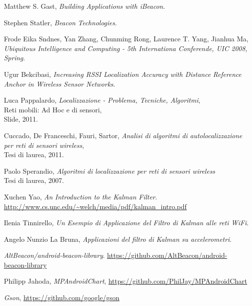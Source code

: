 \begin{thebibliography}{9}
	\bibitem{}
	Matthew S. Gast,
	\textit{Building Applications with iBeacon}.
	
	\bibitem{}
	Stephen Statler,
	\textit{Beacon Technologies}.
	
	\bibitem{}
	Frode Eika Sndnes, Yan Zhang, Chunming Rong, Laurence T. Yang, Jianhua Ma,
	\textit{Ubiquitous Intelligence and Computing - 5th Internationa Conferende, UIC 2008, Spring}.
	
	\bibitem{}
	Ugur Bekcibasi,
	\textit{Increasing RSSI Localization Accuracy with Distance Reference Anchor in Wireless Sensor Networks}.

	
	\bibitem{}
	Luca Pappalardo, 
	\textit{Localizzazione - Problema, Tecniche, Algoritmi},
	\\Reti mobili: Ad Hoc e di sensori, 
	\\Slide, 2011.
	
	\bibitem{}
	Cuccado, De Franceschi, Fauri, Sartor,
	\textit{Analisi di algoritmi di autolocalizzazione per reti di sensori wireless},
	\\Tesi di laurea, 2011.
	
	\bibitem{}
	Paolo Sperandio,
	\textit{Algoritmi di localizzazione per reti di sensori wireless}
	\\Tesi di laurea, 2007.
	
	\bibitem{}
	Xuchen Yao,
	\textit{An Introduction to the Kalman Filter}.
	\\\url{http://www.cs.unc.edu/~welch/media/pdf/kalman_intro.pdf}
		
	\bibitem{}
	Ilenia Tinnirello,
	\textit{Un Esempio di Applicazione 	del Filtro di Kalman alle reti WiFi}.
	
	\bibitem{}
	Angelo Nunzio La Bruna,
	\textit{Applicazioni del filtro di Kalman su accelerometri}.
	
	\bibitem{}
	\textit{AltBeacon/android-beacon-library}.
	\url{https://github.com/AltBeacon/android-beacon-library}
	
	\bibitem{}
	Philipp Jahoda,
	\textit{MPAndroidChart},
	\url{https://github.com/PhilJay/MPAndroidChart}
	
	\bibitem{}
	\textit{Gson},
	\url{https://github.com/google/gson}
	
\end{thebibliography}